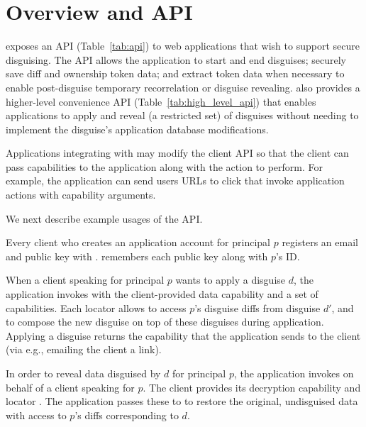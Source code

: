 \section{Overview and API}
\label{s:api}


\sys exposes an API (Table~\ref{tab:api}) to web applications that wish to support secure
disguising.
%
The API allows the application to start and end disguises; securely save diff and ownership token
data; and extract token data when necessary to enable post-disguise temporary recorrelation or
disguise revealing.
%
\sys also provides a higher-level convenience API (Table~\ref{tab:high_level_api}) that enables
applications to apply and reveal (a restricted set) of disguises without needing to implement the
disguise's application database modifications.

Applications integrating with \sys may modify the client API
so that the client can pass capabilities to the application along with the action to perform.
For example, the application can send users URLs to click that invoke application actions with
capability arguments.


We next describe example usages of the API.

Every client who creates an application account for principal $p$ registers an email and public key with \sys.
\sys remembers each public key  along with $p$'s ID.

When a client speaking for principal $p$ wants to apply a disguise $d$,
the application invokes  with the client-provided data
capability and a set of  capabilities. Each locator  allows \sys to
access $p$'s disguise diffs from disguise $d'$, and to compose the new disguise on top of these
disguises during application. Applying a disguise returns the  capability  that
the application sends to the client (via e.g., emailing the client a link).

In order to reveal data disguised by $d$ for principal $p$, the application invokes
 on behalf of a client speaking for $p$. The client provides its decryption capability
 and locator . The application passes these to \sys to restore the
original, undisguised data with access to $p$'s diffs corresponding to $d$.


